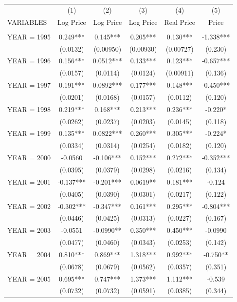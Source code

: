 \begin{tabular}{lccccc} \hline
 & (1) & (2) & (3) & (4) & (5) \\
VARIABLES & Log Price & Log Price & Log Price & Real Price & Price \\ \hline
 &  &  &  &  &  \\
YEAR = 1995 & 0.249*** & 0.145*** & 0.205*** & 0.130*** & -1.338*** \\
 & (0.0132) & (0.00950) & (0.00930) & (0.00727) & (0.230) \\
YEAR = 1996 & 0.156*** & 0.0512*** & 0.133*** & 0.123*** & -0.657*** \\
 & (0.0157) & (0.0114) & (0.0124) & (0.00911) & (0.136) \\
YEAR = 1997 & 0.191*** & 0.0892*** & 0.177*** & 0.148*** & -0.450*** \\
 & (0.0201) & (0.0168) & (0.0157) & (0.0112) & (0.120) \\
YEAR = 1998 & 0.219*** & 0.168*** & 0.213*** & 0.236*** & -0.220* \\
 & (0.0262) & (0.0237) & (0.0203) & (0.0145) & (0.118) \\
YEAR = 1999 & 0.135*** & 0.0822*** & 0.260*** & 0.305*** & -0.224* \\
 & (0.0334) & (0.0314) & (0.0254) & (0.0182) & (0.120) \\
YEAR = 2000 & -0.0560 & -0.106*** & 0.152*** & 0.272*** & -0.352*** \\
 & (0.0395) & (0.0379) & (0.0298) & (0.0216) & (0.134) \\
YEAR = 2001 & -0.137*** & -0.201*** & 0.0619** & 0.181*** & -0.124 \\
 & (0.0405) & (0.0390) & (0.0301) & (0.0217) & (0.122) \\
YEAR = 2002 & -0.302*** & -0.347*** & 0.161*** & 0.295*** & -0.804*** \\
 & (0.0446) & (0.0425) & (0.0313) & (0.0227) & (0.167) \\
YEAR = 2003 & -0.0551 & -0.0990** & 0.350*** & 0.450*** & -0.0990 \\
 & (0.0477) & (0.0460) & (0.0343) & (0.0253) & (0.142) \\
YEAR = 2004 & 0.810*** & 0.869*** & 1.318*** & 0.992*** & -0.750** \\
 & (0.0678) & (0.0679) & (0.0562) & (0.0357) & (0.351) \\
YEAR = 2005 & 0.695*** & 0.747*** & 1.373*** & 1.112*** & -0.539 \\
 & (0.0732) & (0.0732) & (0.0591) & (0.0385) & (0.344) \\

\end{tabular}
